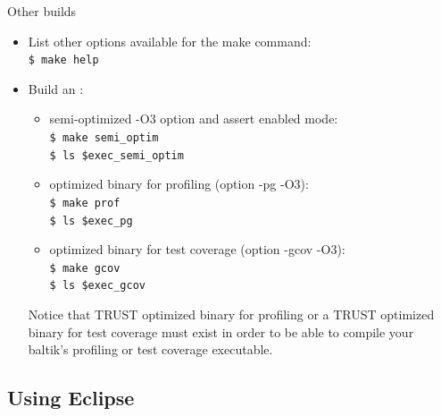 \documentclass[10pt, hyperref={unicode=true,pdfusetitle, bookmarks=true,bookmarksnumbered=false,bookmarksopen=false, breaklinks=false,pdfborder={0 0 1},backref=true,colorlinks=true,linkcolor=darkblue,pageanchor, urlcolor=darkblue}]{beamer}
\begin{document}
\begin{frame}
\frametitle{}
\begin{block}{Other builds}

\begin{itemize}
\item List other options available for the make command:\\
\texttt{\$ make help}

\item Build an :
\begin{itemize}
\item semi-optimized -O3 option and assert enabled mode:\\
\texttt{\$ make semi\_optim}\\
\texttt{\$ ls \$exec\_semi\_optim}

\item optimized binary for profiling (option -pg -O3):\\
\texttt{\$ make prof}\\
\texttt{\$ ls \$exec\_pg}

\item optimized binary for test coverage (option -gcov -O3):\\
\texttt{\$ make gcov}\\
\texttt{\$ ls \$exec\_gcov}
\end{itemize}

{\color{red} Notice that TRUST optimized binary for profiling or a TRUST optimized binary for test coverage must exist in order to be able to compile your baltik's profiling or test coverage executable.} \\
\end{itemize}

\end{block}
\end{frame}



\subsection{{\bf{Using Eclipse}}}
\begin{frame}
\begin{columns}[c] 
\tableofcontents[sections={1-4},currentsection, currentsubsection]
\tableofcontents[sections={5-10},currentsection, currentsubsection]
\end{columns}
\end{frame}
\end{document}
